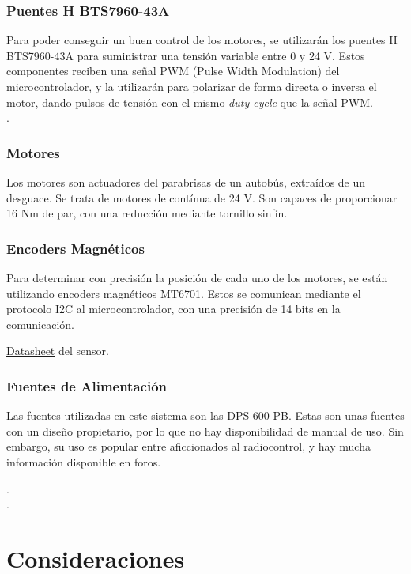 \documentclass[sans]{cdvreport}
\begin{document}
\subsubsection{Puentes H BTS7960-43A}
Para poder conseguir un buen control de los motores, se utilizarán los puentes H BTS7960-43A para suministrar una tensión variable entre 0 y 24 \unit{\volt}. Estos componentes reciben una señal PWM (Pulse Width Modulation) del microcontrolador, y la utilizarán para polarizar de forma directa o inversa el motor, dando pulsos de tensión con el mismo \emph{duty cycle} que la señal PWM.
\\ .

\subsubsection{Motores}
Los motores son actuadores del parabrisas de un autobús, extraídos de un desguace. Se trata de motores de contínua de 24 V. Son capaces de proporcionar 16 Nm de par, con una reducción mediante tornillo sinfín.
\par {}

\subsubsection{Encoders Magnéticos}
Para determinar con precisión la posición de cada uno de los motores, se están utilizando encoders magnéticos MT6701. Estos se comunican mediante el protocolo I2C al microcontrolador, con una precisión de 14 bits en la comunicación.
\\ 
\par \href{https://datasheet4u.com/pdf/1556274/MT6701.pdf}{Datasheet} del sensor.

\subsubsection{Fuentes de Alimentación}
Las fuentes utilizadas en este sistema son las DPS-600 PB. Estas son unas fuentes con un diseño propietario, por lo que no hay disponibilidad de manual de uso. Sin embargo, su uso es popular entre aficcionados al radiocontrol, y hay mucha información disponible en foros. 
\par {}.
\\ .

\section{Consideraciones}
\end{document}
